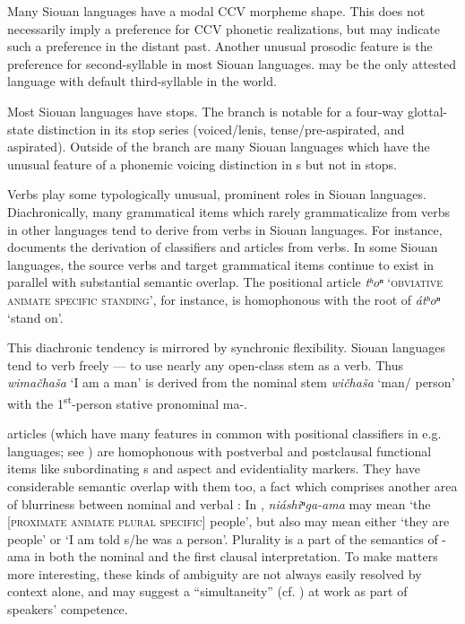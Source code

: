 \begin{refsection}
Many Siouan languages have a modal CCV morpheme shape. This does not necessarily imply a preference for CCV phonetic realizations, but may indicate such a preference in the distant past. Another unusual prosodic feature is the preference for second-syllable  in most Siouan languages.  may be the only attested language with default third-syllable  in the world.


Most Siouan languages have  stops. The  branch is notable for a four-way glottal-state distinction in its stop series (voiced/lenis, tense/pre-aspirated,  and aspirated). Outside of the  branch are many Siouan languages which have the unusual feature of a phonemic voicing distinction in s but not in stops.


Verbs play some typologically unusual, prominent roles in Siouan languages. Diachronically, many grammatical items which rarely grammaticalize from verbs in other languages tend to derive from verbs in Siouan languages. For instance, \citet{Rankin1977} documents the derivation of classifiers and articles from verbs. In some Siouan languages, the source verbs and target grammatical items continue to exist in parallel with substantial semantic overlap. The  positional article \textit{tʰoⁿ} `\textsc{obviative animate specific standing}', for instance, is homophonous with the root of \textit{\'atʰoⁿ} `stand on'.


This diachronic tendency is mirrored by synchronic flexibility. Siouan languages tend to verb freely --- to use nearly any open-class stem as a verb. Thus  \textit{wima\v{c}ha\v{s}a} `I am a man' is derived from the nominal stem \textit{wi\v{c}ha\v{s}a} `man/ person' with the 1\textsuperscript{st}-person stative pronominal ma-.

 articles (which have many features in common with positional classifiers in e.g.  languages; see \citealt{Gordon2009}) are homophonous with postverbal and postclausal functional items like subordinating s and aspect and evidentiality markers. They have considerable semantic overlap with them too, a fact which comprises another area of blurriness between nominal and verbal : In , \textit{ni\'ashiⁿga-ama} may mean `the [\textsc{proximate animate plural specific}] people', but also may mean either `they are people' or `I am told s/he was a person'. Plurality is a part of the semantics of -ama in both the nominal and the first clausal interpretation. To make matters more interesting, these kinds of ambiguity are not always easily resolved by context alone, and may suggest a ``simultaneity'' (cf. \citealt{Woolard1998}) at work as part of speakers' competence. 



\end{refsection}
